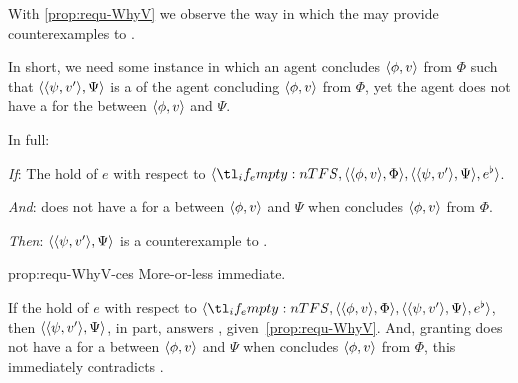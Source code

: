 \begin{note}
  With \autoref{prop:requ-WhyV} we observe the way in which the  may provide counterexamples to \issueConstraint{}.

  In short, we need some instance in which an agent concludes \(\langle \phi, v \rangle\) from \(\Phi\) such that \(\langle \langle \psi, v' \rangle, \Psi \rangle\) is a \requ{} of the agent concluding \(\langle \phi, v \rangle\) from \(\Phi\), yet the agent does not have a \wit{} for the \ros{} between \(\langle \phi, v \rangle\) and \(\Psi\).

  In full:

  \begin{proposition}
    \label{prop:requ-WhyV-ces}
    \vspace{-\baselineskip}
    \begin{itenum}
    \item[\emph{If}:]
      The  hold of \(e\) with respect to \(\langle \vAgent{}, \pvp{\phi}{v}{\Phi}, \pvp{\psi}{v'}{\Psi}, e^{\flat} \rangle\).
    \item[\emph{And}:]
      \label{prop:requ-WhyVCes:noW}
      \vAgent{} does not have a \wit{} for a \ros{} between \(\langle \phi, v \rangle\) and \(\Psi\) when \vAgent{} concludes \(\langle \phi, v \rangle\) from \(\Phi\).
    \item[\emph{Then}:]
      \(\langle \langle \psi, v' \rangle, \Psi \rangle\) is a counterexample to \issueConstraint{}.
    \end{itenum}
    \vspace{-\baselineskip}
  \end{proposition}

  \begin{argument}{prop:requ-WhyV-ces}
    More-or-less immediate.

    If the  hold of \(e\) with respect to \(\langle \vAgent{}, \pvp{\phi}{v}{\Phi}, \pvp{\psi}{v'}{\Psi}, e^{\flat} \rangle\), then \(\langle \langle \psi, v' \rangle, \Psi \rangle\), in part, answers \qWhyV{}, given~\autoref{prop:requ-WhyV}.
    And, granting \vAgent{} does not have a \wit{} for a \ros{} between \(\langle \phi, v \rangle\) and \(\Psi\) when \vAgent{} concludes \(\langle \phi, v \rangle\) from \(\Phi\), this immediately contradicts \issueConstraint{}.
  \end{argument}
\end{note}

